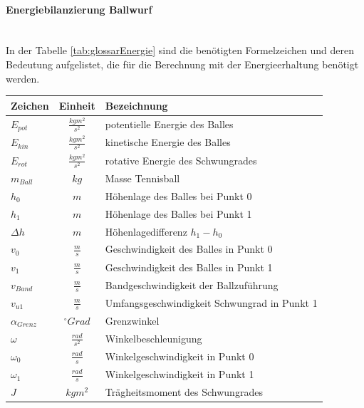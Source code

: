 \paragraph{Energiebilanzierung Ballwurf}$~~$\vspace{2mm}\\
In der Tabelle \ref{tab:glossarEnergie} sind die benötigten Formelzeichen und 
deren Bedeutung aufgelistet, die für die Berechnung mit der Energieerhaltung
benötigt werden.
\begin{table}[h!]
    \begin{tabular}{lcl}
    \rule{0pt}{11pt}Zeichen & Einheit & Bezeichnung \\
    \hline\rule{0pt}{11pt} $E_{pot}$ & $\frac{kgm^2}{s^2}$ & potentielle Energie des Balles \\
    \rule{0pt}{11pt}$E_{kin}$ & $\frac{kgm^2}{s^2}$	& kinetische Energie des Balles \\
    \rule{0pt}{11pt}$E_{rot}$ & $\frac{kgm^2}{s^2}$	& rotative Energie des Schwungrades \\
   	\rule{0pt}{11pt}$m_{Ball}$ & $kg$ & Masse Tennisball \\
   	\rule{0pt}{11pt}$h_0$ & $m$ & Höhenlage des Balles bei Punkt 0 \\
   	\rule{0pt}{11pt}$h_1$ & $m$ & Höhenlage des Balles bei Punkt 1 \\
   	\rule{0pt}{11pt}$\Delta h$ & $m$ & Höhenlagedifferenz $h_1 - h_0$ \\
   	\rule{0pt}{11pt}$v_0$ & $\frac{m}{s}$ & Geschwindigkeit des Balles in Punkt 0 \\
   	\rule{0pt}{11pt}$v_1$ & $\frac{m}{s}$ & Geschwindigkeit des Balles in Punkt 1 \\
   	\rule{0pt}{11pt}$v_{Band}$ & $\frac{m}{s}$ & Bandgeschwindigkeit der Ballzuführung \\
   	\rule{0pt}{11pt}$v_{u1}$ & $\frac{m}{s}$ & Umfangsgeschwindigkeit Schwungrad in Punkt 1 \\
   	\rule{0pt}{11pt}$\alpha_{Grenz}$ & $^\circ Grad$ & Grenzwinkel \\
   	\rule{0pt}{11pt}$\omega$ & $\frac{rad}{s^2}$ & Winkelbeschleunigung \\
   	\rule{0pt}{11pt}$\omega_0$ & $\frac{rad}{s}$ & Winkelgeschwindigkeit in Punkt 0 \\
   	\rule{0pt}{11pt}$\omega_1$ & $\frac{rad}{s}$ & Winkelgeschwindigkeit in Punkt 1 \\
   	\rule{0pt}{11pt}$J$ & $kgm^2$ & Trägheitsmoment des Schwungrades \\

\end{tabular}
\end{table}
